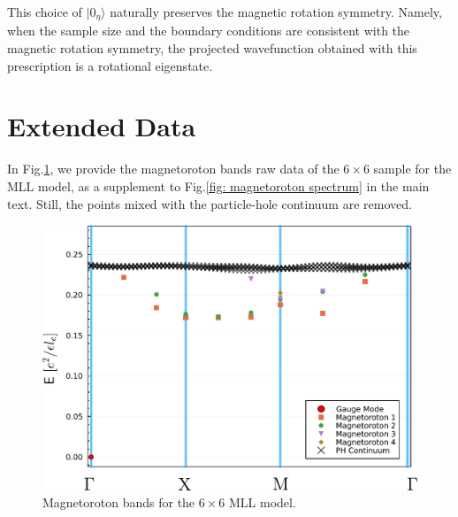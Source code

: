 \begin{subappendices}
This choice of $|0_{\eta}\rangle$ naturally preserves the magnetic rotation symmetry. Namely, when the sample size and the boundary conditions are consistent with the magnetic rotation symmetry, the projected wavefunction obtained with this prescription is a rotational eigenstate.

\section{Extended Data}\label{app:extended_data}
In Fig.\ref{fig: supplemental tdhf bands}, we provide the magnetoroton bands raw data of the $6\times6$ sample for the MLL model, as a supplement to Fig.\ref{fig: magnetoroton spectrum} in the main text. Still, the points mixed with the particle-hole continuum are removed.
\begin{figure}
    \centering
    \includegraphics[width=0.95\linewidth]{contents/FCI_ProjWfc/figures/supplemental_tdhf_bands.pdf}
    \caption{Magnetoroton bands for the $6\times6$ MLL model.}
    \label{fig: supplemental tdhf bands}
\end{figure}
\end{subappendices}